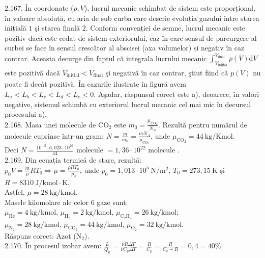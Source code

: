 2.167. În coordonate ($p, V$), lucrul mecanic schimbat de sistem este proporțional, în valoare absolută, cu aria de sub curba care descrie evoluția gazului între starea inițială $1$ şi starea finală $2$. Conform convenției de semne, lucrul mecanic este pozitiv dacă este cedat de sistem exteriorului, caz în care sensul de parcurgere al curbei se face în sensul crescător al abscisei (axa volumelor) și negativ în caz contrar. Aceasta decurge din faptul că integrala lucrului mecanic $\int_{V_{\text {inițial}}}^{V_{\text {final}}} p(V) \mathrm{d} V$ este pozitivă dacă $V_{\text {inițial}}<V_{\text {final}}$ şi negativă în caz contrar, ştiut fiind că $p(V)$ nu poate fi decât pozitivă. În cazurile ilustrate în figură avem $L_{a}<L_{b}<L_{c}<L_{d}<L_{e}<0$. Aşadar, răspunsul corect este a), deoarece, în valori negative, sistemul schimbă cu exteriorul lucrul mecanic cel mai mic în decursul procesului a).\\

2.168. Masa unei molecule de $\mathrm{CO}_{2}$ este $m_{0}=\frac{\mu_{\mathrm{CO}_{2}}}{N_{A}}$. Rezultă pentru numărul de molecule cuprinse într-un gram: $N=\frac{m}{m_{0}}=\frac{m N_{A}}{\mu_{\mathrm{CO}_{2}}}$, unde $\mu_{\mathrm{CO}_{2}}=44 \mathrm{~kg} / \mathrm{Kmol}$.\\ Deci $N=\frac{10^{-3} \cdot 6,023 \cdot 10^{26}}{44} \text { molecule }=1,36 \cdot 10^{22} \text { molecule }$.\\

2.169. Din ecuația termică de stare, rezultă:\\ $p_{0} V=\frac{m}{\mu} R T_{0} \Rightarrow \mu=\frac{\rho R T_{0}}{p_{0}}$, unde $p_{0}=1,013 \cdot 10^{5} \mathrm{~N} / \mathrm{m}^{2}$, $T_{0}=273,15 \mathrm{~K}$ şi $R=8310 \mathrm{~J} / \mathrm{kmol} \cdot \mathrm{K}$.\\ Astfel, $\mu=28 \mathrm{~kg} / \mathrm{kmol}$.\\ Masele kilomolare ale celor 6 gaze sunt:\\ $\mu_{\mathrm{He}}=4 \mathrm{~kg} / \mathrm{kmol}$, $\mu_{\mathrm{H}_{2}}=2 \mathrm{~kg} / \mathrm{kmol}$, $\mu_{\mathrm{C}_{2} \mathrm{H}_{2}}=26 \mathrm{~kg} / \mathrm{kmol}$;\\ $\mu_{\mathrm{N}_{2}}=28 \mathrm{~kg} / \mathrm{kmol}$, $\mu_{\mathrm{CO}_{2}}=44 \mathrm{~kg} / \mathrm{kmol}$, $\mu_{\mathrm{O}_{2}}=32 \mathrm{~kg} / \mathrm{kmol}$.\\ Răspuns corect: Azot ($\mathrm{N}_{2}$).\\

2.170. În procesul izobar avem: $\frac{L}{Q_{p}}=\frac{\nu R \Delta T}{\nu C_{p} \Delta T}=\frac{R}{C_{p}}=\frac{R}{C_{v}+R}=0,4=40 \%$.\\

